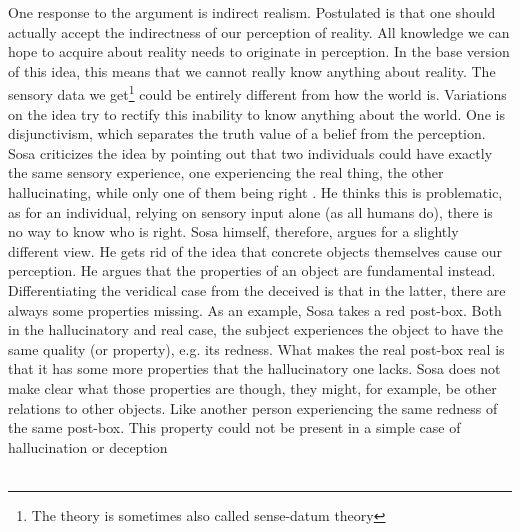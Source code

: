 \documentclass[fleqn,14pt]{article}
\begin{document}
One response to the argument is indirect realism. Postulated is that one should actually accept the indirectness
of our perception of reality. All knowledge we can hope to acquire about reality needs to originate in perception.
In the base version of this idea, this means that we cannot really know anything about reality\cite[p.71ff]{pritchard}.
The sensory data we
get\footnote{The theory is sometimes also called sense-datum theory} could be entirely different from how the
world is. Variations on the idea try to rectify this inability to know anything about
the world. One is disjunctivism, which separates the truth value of a belief from the perception.
Sosa criticizes the idea by pointing out that two individuals could have exactly the same sensory experience,
one experiencing the real thing, the other hallucinating, while only one of them being right
\cite[p.299ff]{sosa}.
He thinks this is problematic, as for an individual, relying on sensory
input alone (as all humans do), there is no way to know who is right. Sosa himself, therefore, argues for a
slightly different view. He gets rid of the idea that concrete objects themselves cause our 
perception\cite[p.301ff]{sosa}. He argues that the properties of an object are fundamental instead.
Differentiating the veridical case from the deceived is that in the latter, there are always some properties missing.
As an example, Sosa takes a red post-box. Both in the hallucinatory and real case, the subject experiences 
the object to have the same quality (or property), e.g. its redness. What makes the real post-box real
is that it has some more properties that the hallucinatory one lacks. Sosa does not make clear what those properties are
though, they might, for example, be other relations to other objects. Like another person experiencing the same
redness of the same post-box. This property could not be present in a simple case of hallucination or deception\\
\\
\end{document}
